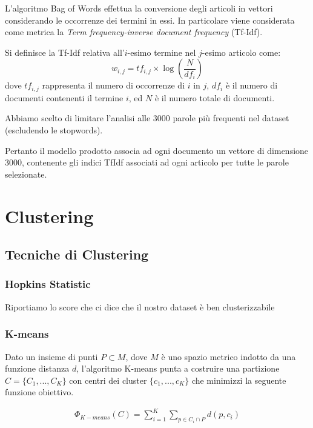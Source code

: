 \documentclass[
	12pt, %
	a4paper, %
	oneside, %
	headinclude,footinclude, %
	BCOR5mm, %
]{scrartcl}
\begin{document}
	L'algoritmo Bag of Words\cite{bagofwords} effettua la conversione degli articoli in vettori considerando le occorrenze dei termini in essi.
	In particolare viene considerata come metrica la \textit{Term frequency-inverse document frequency} (Tf-Idf).

	Si definisce la Tf-Idf relativa all'$i$-esimo termine nel $j$-esimo articolo come:
	$$ w_{i,j}=tf_{i,j}\times\log \left(\frac{N}{df_{i}} \right) $$
	dove $tf_{i,j}$ rappresenta il numero di occorrenze di $i$ in $j$, $df_{i}$ è il numero di documenti contenenti il termine $i$, ed $N$ è il numero totale di documenti.

	Abbiamo scelto di limitare l'analisi alle 3000 parole pi\`{u} frequenti nel dataset (escludendo le stopwords).

	Pertanto il modello prodotto associa ad ogni documento un vettore di dimensione 3000, contenente gli indici TfIdf associati ad ogni articolo per tutte le parole selezionate.

\section{Clustering}

	\subsection{Tecniche di Clustering}

		\subsubsection{Hopkins Statistic}
			Riportiamo lo score che ci dice che il nostro dataset è ben clusterizzabile

		\subsubsection{K-means}
			Dato un insieme di punti $P \subset M$, dove $M$ è uno spazio metrico indotto da una funzione distanza $d$, l'algoritmo K-means punta a costruire una partizione $C = \{ C_1, ..., C_K \}$ con centri dei cluster $\{ c_1, ..., c_K\}$ che minimizzi la seguente funzione obiettivo.

			\begin{equation} \begin{align}
				\Phi_{K-means} (C) = \sum_{i=1}^K \sum_{p \in C_i \cap P} d(p, c_i)
			\end{align} \end{equation}
\end{document}
